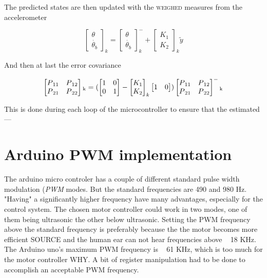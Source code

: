 \documentclass[a4paper,11pt]{kth-mag}
\begin{document}
The predicted states are then updated with the \textsc{weighed} measures from the accelerometer

\begin{equation}
\begin{bmatrix}
\theta \\
\dot{\theta_b}
\end{bmatrix}_k
=
\begin{bmatrix}
\theta \\
\dot{\theta_b}
\end{bmatrix}_k^-
+
\begin{bmatrix}
K_1 \\ K_2
\end{bmatrix}_k
\textbf{$\tilde{y}$}
\end{equation}

And then at last the error covariance

\begin{equation}
\begin{bmatrix}
P\textsubscript{11} & P\textsubscript{12} \\
P\textsubscript{21} & P\textsubscript{22}
\end{bmatrix}\textsubscript{k} 
=(
 \begin{bmatrix}
1 & 0 \\
0 & 1
\end{bmatrix}
-
\begin{bmatrix}
K_1 \\ K_2
\end{bmatrix}_k
\begin{bmatrix}
1 & 0
\end{bmatrix}
)
\begin{bmatrix}
P\textsubscript{11} & P\textsubscript{12} \\
P\textsubscript{21} & P\textsubscript{22}
\end{bmatrix}^-\textsubscript{k}
\end{equation}


This is done during each loop of the microcontroller to ensure that the estimated ---

\section{Arduino PWM implementation} \label{app: PWM}
The arduino micro controler has a couple of different standard pulse width modulation (\textit{PWM} modes. But the standard frequencies are 490 and 980 Hz. "Having" a significantly higher 
frequency have many advantages, especially for the control system. The chosen motor controller could work in two modes, one of them being ultrasonic the other below ultrasonic. Setting the PWM frequency above the standard frequency is preferably because the the motor becomes more efficient \textsc{SOURCE} and the human ear can not hear frequencies above ~ 18 KHz. The Arduino uno's maximum PWM frequency is ~ 61 KHz, which is too much for the motor controller \textsc{WHY}. A bit of register manipulation had to be 
done to accomplish an acceptable PWM frequency.
\end{document}
